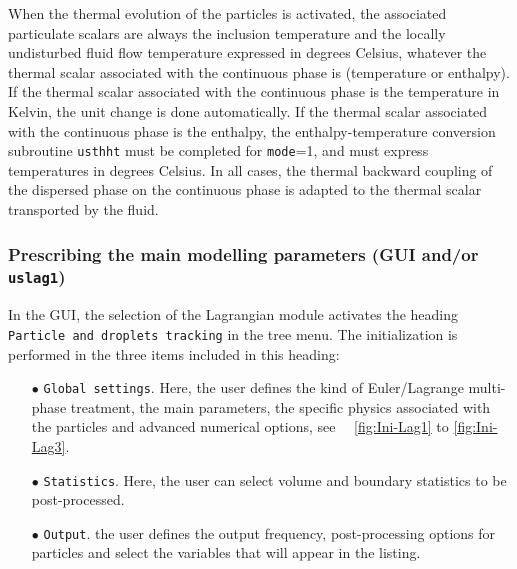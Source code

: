 {{When the thermal evolution of the particles is activated, the associated particulate scalars are always the inclusion temperature and the locally undisturbed fluid flow temperature expressed in degrees Celsius, whatever the thermal scalar associated with the continuous phase is (temperature or enthalpy). If the
thermal scalar associated with the continuous phase is the temperature in Kelvin, the unit change is done automatically. If the thermal scalar associated with the continuous phase is the enthalpy, the enthalpy-temperature conversion subroutine \texttt{usthht} must be completed for \texttt{mode}=1, and must express temperatures in degrees Celsius. In all cases, the thermal backward coupling of the dispersed phase on the continuous phase is adapted to the thermal scalar transported by the fluid.


\subsubsection{Prescribing the main modelling parameters (GUI and/or \texttt{uslag1})}\label{sec:Ini-lag}


In the GUI, the selection of the Lagrangian module activates the heading \texttt{Particle and droplets tracking} in the tree menu. The initialization is performed in the three items included in this heading:
%
\begin{itemize}
 \item [$\bullet$] \texttt{Global settings}. Here, the user defines the kind of Euler/Lagrange multi-phase treatment, the main parameters, the specific physics associated with the particles and advanced numerical options, see ~\figurename~\ref {fig:Ini-Lag1} to \figurename\ref {fig:Ini-Lag3}.
 \item [$\bullet$] \texttt{Statistics}. Here, the user can select volume and boundary statistics to be post-processed.
 \item [$\bullet$] \texttt{Output}. the user defines the output frequency, post-processing options for particles and select the variables that will appear in the listing.
\end{itemize}

}}
